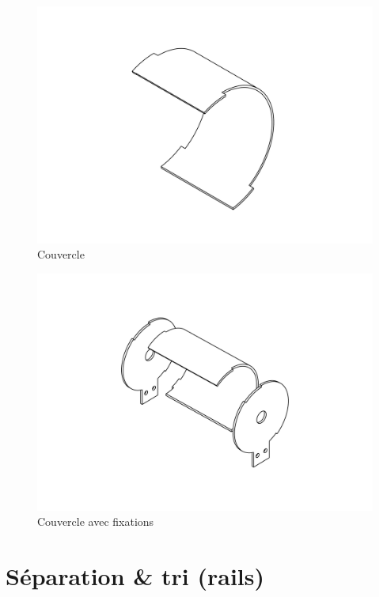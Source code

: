 \begin{figure}
    \centering
    \includegraphics[width=\textwidth]{Graphics/Roue/DRAWING_COUVERCLE.pdf}
    \caption{Couvercle}
\end{figure}

\begin{figure}
    \centering
    \includegraphics[width=\textwidth]{Graphics/Roue/DRAWING_COUVERCLE_DEMI_COMPLET.pdf}
    \caption{Couvercle avec fixations}
\end{figure}

\section{Séparation \& tri (rails)}

